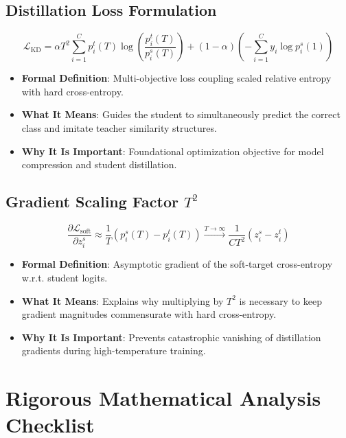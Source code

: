 \documentclass[11pt,a4paper]{article}
\theoremstyle{definition}
\begin{document}
\subsection{Distillation Loss Formulation}
{\boldmath
\begin{equation}
\mathcal{L}_{\text{KD}} = \alpha T^2 \sum_{i=1}^C p_i^t(T) \log \left(\frac{p_i^t(T)}{p_i^s(T)}\right) + (1 - \alpha) \left( - \sum_{i=1}^C y_i \log p_i^s(1) \right)
\end{equation}
}
\begin{itemize}
    \item \textbf{Formal Definition}: Multi-objective loss coupling scaled relative entropy with hard cross-entropy.
    \item \textbf{What It Means}: Guides the student to simultaneously predict the correct class and imitate teacher similarity structures.
    \item \textbf{Why It Is Important}: Foundational optimization objective for model compression and student distillation.
\end{itemize}

\subsection{Gradient Scaling Factor $T^2$}
{\boldmath
\begin{equation}
\frac{\partial \mathcal{L}_{\text{soft}}}{\partial z_i^s} \approx \frac{1}{T} (p_i^s(T) - p_i^t(T)) \xrightarrow{T \to \infty} \frac{1}{C T^2} (z_i^s - z_i^t)
\end{equation}
}
\begin{itemize}
    \item \textbf{Formal Definition}: Asymptotic gradient of the soft-target cross-entropy w.r.t. student logits.
    \item \textbf{What It Means}: Explains why multiplying by $T^2$ is necessary to keep gradient magnitudes commensurate with hard cross-entropy.
    \item \textbf{Why It Is Important}: Prevents catastrophic vanishing of distillation gradients during high-temperature training.
\end{itemize}

\section{Rigorous Mathematical Analysis Checklist}
\end{document}
